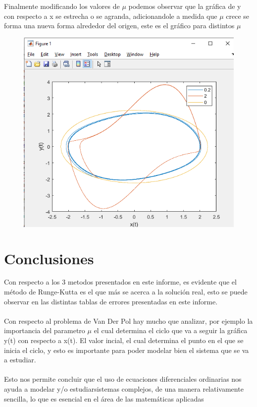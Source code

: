 \documentclass[12pt]{article}
\begin{document}
\newpage
Finalmente modificando los valores de $\mu$ podemos observar que la gráfica de y con respecto a x se estrecha o se agranda, adicionandole a medida que $\mu$ crece se forma una nueva forma alrededor del origen, este es el gráfico para distintos $\mu$\\
\begin{figure}[h]
	\centering
	\caption{}
	\includegraphics[scale=0.45]{graf10.png}
	\label{graf10}
\end{figure}
\section{Conclusiones}
Con respecto a los 3 metodos presentados en este informe, es evidente que el método de Runge-Kutta es el que más se acerca a la solución real, esto se puede observar en las distintas tablas de errores presentadas en este informe.\\\\
Con respecto al problema de Van Der Pol hay mucho que analizar, por ejemplo la importancia del parametro $\mu$ el cual determina el ciclo que va a seguir la gráfica y(t) con respecto a x(t). El valor incial, el cual determina el punto en el que se inicia el ciclo, y esto es importante para poder modelar bien el sistema que se va a estudiar.\\\\
Esto nos permite concluir que el uso de ecuaciones diferenciales ordinarias nos ayuda a modelar y/o estudiarsistemas complejos, de una manera relativamente sencilla, lo que es esencial en el área de las matemáticas aplicadas
\end{document}
